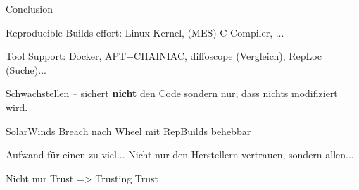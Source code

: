 \begin{frame}{Conclusion}
{    \item Reproducible Builds effort: Linux Kernel, (MES) C-Compiler,  ...
    \item Tool Support: Docker, APT+CHAINIAC, diffoscope (Vergleich), RepLoc (Suche)...
    \item Schwachstellen -- sichert \textbf{nicht} den Code sondern nur, dass nichts modifiziert wird.
    \item SolarWinds Breach nach Wheel mit RepBuilds behebbar
    \item Aufwand für einen zu viel... Nicht nur den Herstellern vertrauen, sondern allen...
    \item Nicht nur Trust => Trusting Trust
}
\end{frame}


%

